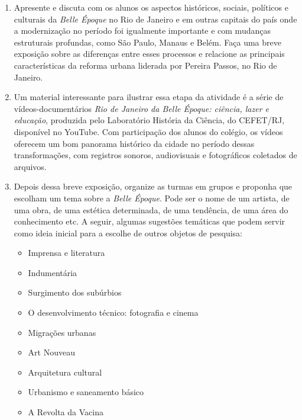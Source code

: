 \documentclass[12pt]{extarticle}
\begin{document}
\begin{enumerate}

\item
Apresente e discuta com os alunos os aspectos
históricos, sociais, políticos e culturais da \emph{Belle Époque} no Rio
de Janeiro e em outras capitais do país onde a modernização no período
foi igualmente importante e com mudanças estruturais profundas, como São
Paulo, Manaus e Belém. Faça uma breve exposição sobre as diferenças
entre esses processos e relacione as principais características da
reforma urbana liderada por Pereira Passos, no Rio de Janeiro.

\item
Um material interessante para ilustrar essa etapa da atividade é a
série de vídeos-documentários \emph{Rio de Janeiro da Belle Époque:
ciência, lazer e educação}, produzida pelo Laboratório História da
Ciência, do CEFET/RJ, disponível no YouTube. Com participação dos
alunos do colégio, os vídeos oferecem um bom panorama histórico da
cidade no período dessas transformações, com registros sonoros,
audiovisuais e fotográficos coletados de arquivos.

\item
Depois dessa breve exposição, organize as turmas em grupos e proponha
que escolham um tema sobre a \emph{Belle Époque}. Pode ser o nome de um
artista, de uma obra, de uma estética determinada, de uma tendência, de
uma área do conhecimento etc. A seguir, algumas sugestões temáticas que
podem servir como ideia inicial para a escolhe de outros
objetos de pesquisa:






\begin{itemize}
\item
  Imprensa e literatura
\item
  Indumentária
\item
  Surgimento dos subúrbios
\item
  O desenvolvimento técnico: fotografia e cinema
\item
  Migrações urbanas
\item
  Art Nouveau
\item
  Arquitetura cultural
\item
  Urbanismo e saneamento básico
\item
  A Revolta da Vacina
\end{itemize}




\end{enumerate}
\end{document}
